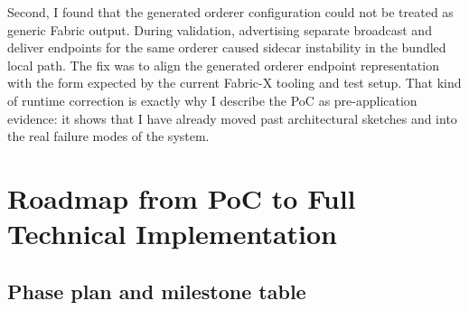 Second, I found that the generated orderer configuration could not be treated as generic Fabric output. During validation, advertising separate broadcast and deliver endpoints for the same orderer caused sidecar instability in the bundled local path. The fix was to align the generated orderer endpoint representation with the form expected by the current Fabric-X tooling and test setup. That kind of runtime correction is exactly why I describe the PoC as pre-application evidence: it shows that I have already moved past architectural sketches and into the real failure modes of the system.

\section{Roadmap from PoC to Full Technical Implementation}

\subsection{Phase plan and milestone table}

